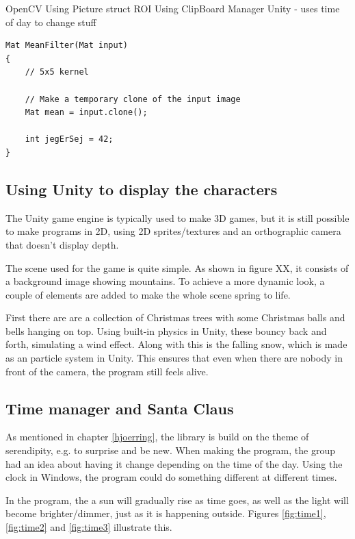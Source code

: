 OpenCV
Using Picture struct
ROI
Using ClipBoard Manager
Unity - uses time of day to change stuff

\begin{lstlisting}
Mat MeanFilter(Mat input)
{
	// 5x5 kernel

	// Make a temporary clone of the input image
	Mat mean = input.clone();

	int jegErSej = 42;
}
\end{lstlisting}

\subsection{Using Unity to display the characters}
The Unity game engine is typically used to make 3D games, but it is still possible to make programs in 2D, using 2D sprites/textures and an orthographic camera that doesn't display depth.

The scene used for the game is quite simple. As shown in figure XX, it consists of a background image showing mountains. To achieve a more dynamic look, a couple of elements are added to make the whole scene spring to life.

First there are are a collection of Christmas trees with some Christmas balls and bells hanging on top. Using built-in physics in Unity, these bouncy back and forth, simulating a wind effect. Along with this is the falling snow, which is made as an particle system in Unity. This ensures that even when there are nobody in front of the camera, the program still feels alive.

\subsection{Time manager and Santa Claus}
As mentioned in chapter \ref{hjoerring}, the library is build on the theme of serendipity, e.g. to surprise and be new. When making the program, the group had an idea about having it change depending on the time of the day. Using the clock in Windows, the program could do something different at different times.

In the program, the a sun will gradually rise as time goes, as well as the light will become brighter/dimmer, just as it is happening outside. Figures \ref{fig:time1}, \ref{fig:time2} and \ref{fig:time3} illustrate this.

